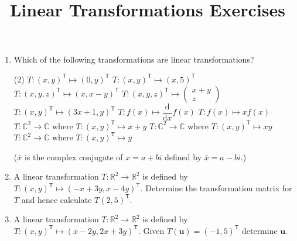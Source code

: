 \documentclass[a4paper,11pt]{article}
\title{Linear Transformations Exercises}
\begin{document}
\maketitle

\begin{enumerate}[label=6.\arabic*]
    \item Which of the following transformations are linear transformations?
    \begin{tasks}(2)
        \task $T: (x, y)^\mathsf{T} \mapsto (0, y)^\mathsf{T}$
        \task $T: (x, y)^\mathsf{T} \mapsto (x, 5)^\mathsf{T}$
        \task $T: (x, y, z)^\mathsf{T} \mapsto (x, x - y)^\mathsf{T}$
        \task $T: (x, y, z)^\mathsf{T} \mapsto \begin{pmatrix} x + y \\ z \end{pmatrix}$
        \task $T: (x, y)^\mathsf{T} \mapsto (3x + 1, y)^\mathsf{T}$
        \task $T: f(x) \mapsto \dfrac{\mathrm{d}}{\mathrm{d}x} f(x)$
        \task $T: f(x) \mapsto xf(x)$
        \task $T: \mathbb{C}^2 \to \mathbb{C}$ where $T: (x, y)^\mathsf{T} \mapsto x + y$
        \task $T: \mathbb{C}^2 \to \mathbb{C}$ where $T: (x, y)^\mathsf{T} \mapsto x y$
        \task $T: \mathbb{C}^2 \to \mathbb{C}$ where $T: (x, y)^\mathsf{T} \mapsto \bar{y}$
    \end{tasks}
    ($\bar{x}$ is the complex conjugate of $x = a + bi$ defined by $\bar{x} = a - bi$.)

    \item A linear transformation $T: \mathbb{R}^2 \to \mathbb{R}^2$ is defined by $T: (x, y)^\mathsf{T} \mapsto (-x + 3y, x - 4y)^\mathsf{T}$. Determine the transformation matrix for $T$ and hence calculate $T (2, 5)^\mathsf{T}$.
    
    \item A linear transformation $T: \mathbb{R}^2 \to \mathbb{R}^2$ is defined by $T: (x, y)^\mathsf{T} \mapsto (x - 2y, 2x + 3y)^\mathsf{T}$. Given $T(\mathbf{u}) = (-1, 5)^\mathsf{T}$ determine $\mathbf{u}$.
    

\end{enumerate}
\end{document}
